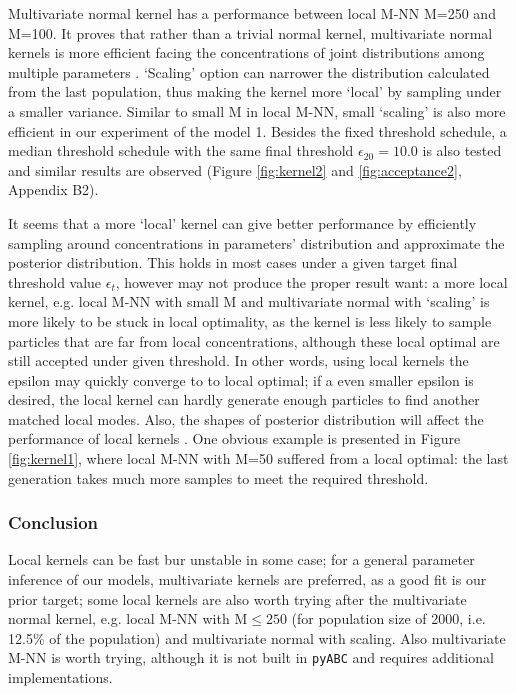 Multivariate normal kernel has a performance between local M-NN M=250 and M=100. It proves that rather than a trivial normal kernel, multivariate normal kernels is more efficient facing the concentrations of joint distributions among multiple parameters \cite{ref:kernel}. `Scaling' option can narrower the distribution calculated from the last population, thus making the kernel more `local' by sampling under a smaller variance. Similar to small M in local M-NN, small `scaling' is also more efficient in our experiment of the model 1. Besides the fixed threshold schedule, a median threshold schedule with the same final threshold $\epsilon_{20}=10.0$ is also tested and similar results are observed (Figure \ref{fig:kernel2} and \ref{fig:acceptance2}, Appendix B2).

It seems that a more `local' kernel can give better performance by efficiently sampling around concentrations in parameters' distribution and approximate the posterior distribution. This holds in most cases under a given target final threshold value $\epsilon_t$, however may not produce the proper result want: a more local kernel, e.g. local M-NN with small M and multivariate normal with `scaling' is more likely to be stuck in local optimality, as the kernel is less likely to sample particles that are far from local concentrations, although these local optimal are still accepted under given threshold. In other words, using local kernels the epsilon may quickly converge to to local optimal; if a even smaller epsilon is desired, the local kernel can hardly generate enough particles to find another matched local modes. Also, the shapes of posterior distribution will affect the performance of local kernels \cite{ref:kernel}. One obvious example is presented in Figure \ref{fig:kernel1}, where local M-NN with M=50 suffered from a local optimal: the last generation takes much more samples to meet the required threshold.

\subsubsection{Conclusion} Local kernels can be fast bur unstable in some case; for a general parameter inference of our models, multivariate kernels are preferred, as a good fit is our prior target; some local kernels are also worth trying after the multivariate normal kernel, e.g. local M-NN with M$\leq 250$ (for population size of 2000, i.e. 12.5\% of the population) and multivariate normal with scaling. Also multivariate M-NN is worth trying, although it is not built in \verb|pyABC| and requires additional implementations.


